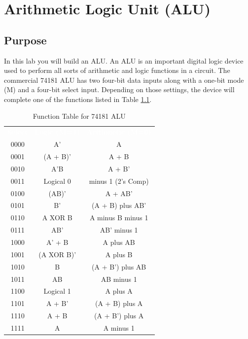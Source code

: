 \chapter{Arithmetic Logic Unit (ALU)}\label{alu}

\section{Purpose}

In this lab you will build an \acf{ALU}. An \ac{ALU} is an important digital logic device used to perform all sorts of arithmetic and logic functions in a circuit. The commercial 74181 \ac{ALU} has two four-bit data inputs along with a one-bit mode (M) and a four-bit select input. Depending on those settings, the device will complete one of the functions listed in Table \ref{tab0301}.

\begin{table}[H]
	\sffamily
	\newcommand{\head}[1]{\textcolor{white}{\textbf{#1}}}		
	\begin{center}
		\begin{tabular}{ccc} 
			\rowcolor{black!75}
			\head{Select} & \head{Logic (M=1)} &\head{Arithmetic (M=0)} \\
			0000 & A' & A \\
			0001 & (A + B)' & A + B \\
			0010 & A'B & A + B' \\
			0011 & Logical 0 & minus 1 (2's Comp) \\
			0100 & (AB)' & A + AB' \\
			0101 & B' & (A + B) plus AB' \\
			0110 & A XOR B & A minus B minus 1 \\
			0111 & AB' & AB' minus 1 \\
			1000 & A' + B & A plus AB \\
			1001 & (A XOR B)' & A plus B \\
			1010 & B & (A + B') plus AB \\
			1011 & AB & AB minus 1 \\
			1100 & Logical 1 & A plus A \\
			1101 & A + B' & (A + B) plus A \\
			1110 & A + B & (A + B') plus A \\
			1111 & A & A minus 1
		\end{tabular}
	\end{center}
	\caption{Function Table for 74181 ALU}
	\label{tab0301}
\end{table}

